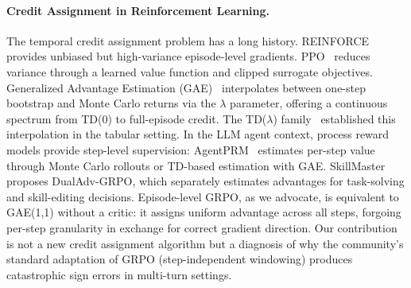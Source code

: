 \paragraph{Credit Assignment in Reinforcement Learning.}
The temporal credit assignment problem has a long history. REINFORCE~\cite{williams1992reinforce} provides unbiased but high-variance episode-level gradients. PPO~\cite{schulman2017ppo} reduces variance through a learned value function and clipped surrogate objectives. Generalized Advantage Estimation (GAE)~\cite{schulman2016gae} interpolates between one-step bootstrap and Monte Carlo returns via the $\lambda$ parameter, offering a continuous spectrum from TD(0) to full-episode credit. The TD($\lambda$) family~\cite{sutton1988td} established this interpolation in the tabular setting. In the LLM agent context, process reward models provide step-level supervision: AgentPRM~\cite{choudhury2025agentprm,xi2025agentprm} estimates per-step value through Monte Carlo rollouts or TD-based estimation with GAE. SkillMaster~\cite{skillmaster2026} proposes DualAdv-GRPO, which separately estimates advantages for task-solving and skill-editing decisions. Episode-level GRPO, as we advocate, is equivalent to GAE(1,1) without a critic: it assigns uniform advantage across all steps, forgoing per-step granularity in exchange for correct gradient direction. Our contribution is not a new credit assignment algorithm but a diagnosis of why the community's standard adaptation of GRPO (step-independent windowing) produces catastrophic sign errors in multi-turn settings.

